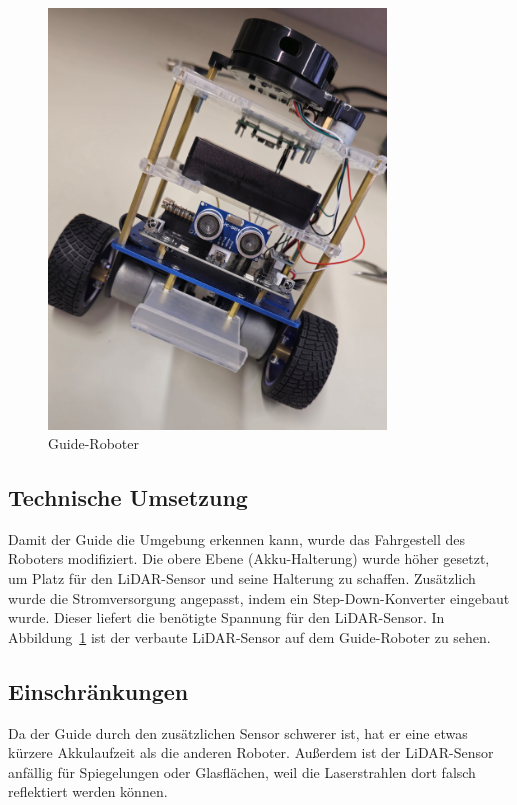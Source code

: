 \begin{figure}[H]
   \centering
   \includegraphics[width=0.8\textwidth]{img/Hardware/guide.jpg}
   \caption{Guide-Roboter}
    \label{fig:guide}
\end{figure}

\subsection{Technische Umsetzung}
Damit der Guide die Umgebung erkennen kann, wurde das Fahrgestell des Roboters modifiziert.
%
Die obere Ebene (Akku-Halterung) wurde höher gesetzt, um Platz für den LiDAR-Sensor und seine Halterung zu schaffen.
%
Zusätzlich wurde die Stromversorgung angepasst, indem ein Step-Down-Konverter eingebaut wurde.
%
Dieser liefert die benötigte Spannung für den LiDAR-Sensor.
%
In Abbildung~\ref{fig:guide} ist der verbaute LiDAR-Sensor auf dem Guide-Roboter zu sehen.

\subsection{Einschränkungen}
Da der Guide durch den zusätzlichen Sensor schwerer ist, hat er eine etwas kürzere Akkulaufzeit als die anderen Roboter.
%
Außerdem ist der LiDAR-Sensor anfällig für Spiegelungen oder Glasflächen,
weil die Laserstrahlen dort falsch reflektiert werden können.

